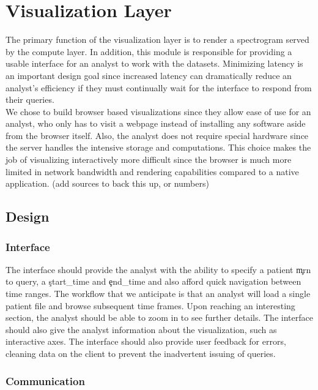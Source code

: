 \chapter{Visualization Layer}\label{viz-ch}

The primary function of the visualization layer is to render a spectrogram
served by the compute layer. In addition, this module is responsible for
providing a usable interface for an analyst to work with the datasets.
Minimizing latency is an important design goal since increased latency can
dramatically reduce an analyst's efficiency if they must continually wait for
the interface to respond from their queries. \\

We chose to build browser based visualizations since they allow ease of use for
an analyst, who only has to visit a webpage instead of installing any software
aside from the browser itself. Also, the analyst does not require special
hardware since the server handles the intensive storage and computations.  This
choice makes the job of visualizing interactively more difficult since the
browser is much more limited in network bandwidth and rendering capabilities
compared to a native application. (add sources to back this up, or numbers)

\section{Design}

\subsection{Interface}

The interface should provide the analyst with the ability to specify a patient
\c{mrn} to query, a \c{start\_time} and \c{end\_time} and also afford quick
navigation between time ranges. The workflow that we anticipate is that an
analyst will load a single patient file and browse subsequent time frames. Upon
reaching an interesting section, the analyst should be able to zoom in to see
further details. The interface should also give the analyst information about
the visualization, such as interactive axes. The interface should also provide
user feedback for errors, cleaning data on the client to prevent the
inadvertent issuing of queries.

\subsection{Communication}

